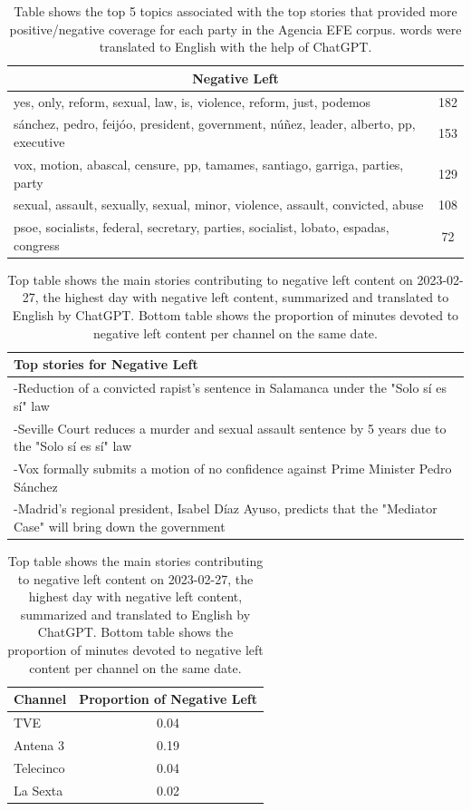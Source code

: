 \documentclass[12pt]{article}
\begin{document}
\begin{table}[h!]
\begin{tabular}{|l|c|}
		\multicolumn{2}{|c|}{\textbf{Negative Left}} \\
		\hline
		yes, only, reform, sexual, law, is, violence, reform, just, podemos & 182 \\
		sánchez, pedro, feijóo, president, government, núñez, leader, alberto, pp, executive & 153 \\
		vox, motion, abascal, censure, pp, tamames, santiago, garriga, parties, party & 129 \\
		sexual, assault, sexually, sexual, minor, violence, assault, convicted, abuse & 108 \\
		psoe, socialists, federal, secretary, parties, socialist, lobato, espadas, congress & 72 \\
		\hline
	\end{tabular}
	\caption{Table shows the top 5 topics associated with the top stories that provided more positive/negative coverage for each party in the Agencia EFE corpus. words were translated to English with the help of ChatGPT. }
\end{table}

	
	
	
		\begin{table}[h!]
		\centering
		\begin{tabular}{p{}}
			\toprule
			\textbf{Top stories for  Negative Left}  \\
			\midrule
			-Reduction of a convicted rapist’s sentence in Salamanca under the "Solo sí es sí" law  \\
			-Seville Court reduces a murder and sexual assault sentence by 5 years due to the "Solo sí es sí" law  \\
			-Vox formally submits a motion of no confidence against Prime Minister Pedro Sánchez  \\
			-Madrid’s regional president, Isabel Díaz Ayuso, predicts that the "Mediator Case" will bring down the government  \\
			\bottomrule
		\end{tabular}
		\begin{tabular}{l c}
			\toprule
			\textbf{Channel} & \textbf{Proportion of Negative Left} \\
			\midrule
			TVE & 0.04 \\
			Antena 3  & 0.19 \\
			Telecinco  & 0.04 \\
			La Sexta  & 0.02 \\
			\bottomrule
		\end{tabular}
		\caption{Top table shows the main stories contributing to negative left content on 2023-02-27, the highest day with negative left content,  summarized and translated to English by ChatGPT. Bottom table shows the proportion of minutes devoted to negative left content per channel on the same date.}
		\label{tab:neg_left_channels}
	\end{table}
	
\end{document}
